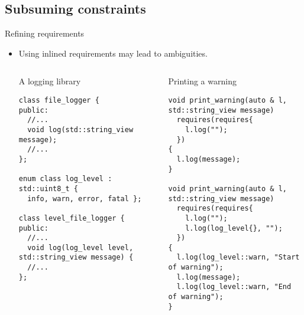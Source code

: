 \subsection{Subsuming constraints}

\begin{frame}[t,fragile]{Refining requirements}
\begin{itemize}
  \item Using inlined requirements may lead to ambiguities.

\begin{columns}[T]

\begin{block}{A logging library}
\begin{lstlisting}[basicstyle=\mode<presentation>{\tiny}]
class file_logger {
public:
  //...
  void log(std::string_view message);
  //...
};

enum class log_level : std::uint8_t { 
  info, warn, error, fatal };

class level_file_logger {
public:
  //...
  void log(log_level level, std::string_view message) {
  //...
};
\end{lstlisting}
\end{block}

\begin{block}{Printing a warning}
\begin{lstlisting}[basicstyle=\mode<presentation>{\tiny}]
void print_warning(auto & l, std::string_view message)
  requires(requires{
    l.log("");
  })
{
  l.log(message);
}

void print_warning(auto & l, std::string_view message)
  requires(requires{
    l.log("");
    l.log(log_level{}, "");
  })
{
  l.log(log_level::warn, "Start of warning");
  l.log(message);
  l.log(log_level::warn, "End of warning");
}
\end{lstlisting}
\end{block}

\end{columns}

\end{itemize}
\end{frame}

